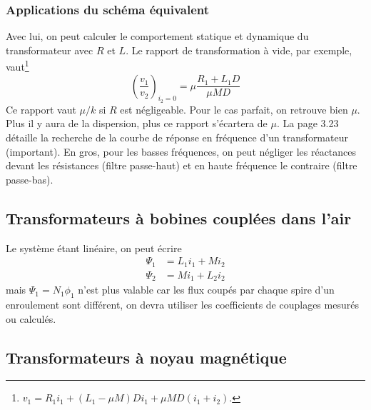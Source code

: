 		\subsubsection{Applications du schéma équivalent}
		Avec lui, on peut calculer le comportement statique et dynamique du 
		transformateur avec $R$ et $L$. Le rapport de transformation à vide, par 
		exemple, vaut\footnote{$v_1 = R_1i_1 + (L_1-\mu M)Di_1 + \mu MD(i_1+i_2)$.}
		\begin{equation}
		\left(\dfrac{v_1}{v_2}\right)_{i_2=0} = \mu\dfrac{R_1+L_1D}{\mu MD}
		\end{equation}
		Ce rapport vaut $\mu/k$ si $R$ est 
		négligeable. Pour le cas parfait, on retrouve bien $\mu$. Plus il y 
		aura de la dispersion, plus ce rapport s'écartera de $\mu$.
		La page 3.23 détaille la recherche de la courbe de réponse en fréquence 
		d'un transformateur (important). En gros, pour les basses fréquences, on peut
		négliger les réactances devant les résistances (filtre passe-haut) et en haute 
		fréquence le
		contraire (filtre passe-bas). 
		
	\subsection{Transformateurs à bobines couplées dans l'air}
		Le système étant linéaire, on peut écrire
		\begin{equation}
		\begin{array}{ll}
		\Psi_1 &= L_1i_1 + Mi_2\\
		\Psi_2 &= Mi_1 + L_2i_2
		\end{array}
		\end{equation}
		mais $\Psi_1=N_1\phi_1$ n'est plus valable car les flux coupés par chaque 
		spire d'un enroulement sont différent, on devra utiliser les coefficients 
		de couplages mesurés ou calculés.
		
	\subsection{Transformateurs à noyau magnétique}
